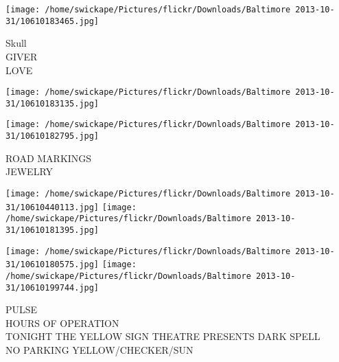 \documentclass[10pt,letterpaper]{article}
\begin{document}
\texttt{[image: /home/swickape/Pictures/flickr/Downloads/Baltimore 2013-10-31/10610183465.jpg]}

Skull\\
GIVER\\
LOVE\\
\pagebreak

\texttt{[image: /home/swickape/Pictures/flickr/Downloads/Baltimore 2013-10-31/10610183135.jpg]}

\vspace{0.25in}
\texttt{[image: /home/swickape/Pictures/flickr/Downloads/Baltimore 2013-10-31/10610182795.jpg]}

ROAD MARKINGS\\
JEWELRY\\
\pagebreak

\texttt{[image: /home/swickape/Pictures/flickr/Downloads/Baltimore 2013-10-31/10610440113.jpg]}
\texttt{[image: /home/swickape/Pictures/flickr/Downloads/Baltimore 2013-10-31/10610181395.jpg]}

\texttt{[image: /home/swickape/Pictures/flickr/Downloads/Baltimore 2013-10-31/10610180575.jpg]}
\texttt{[image: /home/swickape/Pictures/flickr/Downloads/Baltimore 2013-10-31/10610199744.jpg]}

PULSE\\
HOURS OF OPERATION\\
TONIGHT THE YELLOW SIGN THEATRE PRESENTS DARK SPELL\\
NO PARKING YELLOW/CHECKER/SUN\\
\pagebreak
\end{document}
